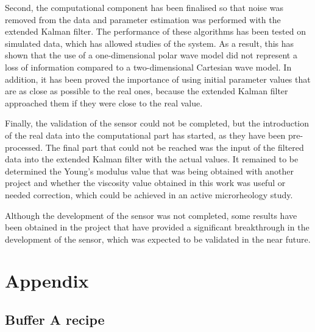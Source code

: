 \documentclass[12pt, a4paper]{article} %
\begin{document}
	Second, the computational component has been finalised so that noise was removed from the data and parameter estimation was performed with the extended Kalman filter. The performance of these algorithms has been tested on simulated data, which has allowed studies of the system. As a result, this has shown that the use of a one-dimensional polar wave model did not represent a loss of information compared to a two-dimensional Cartesian wave model. 
	In addition, it has been proved the importance of using initial parameter values that are as close as possible to the real ones, because the extended Kalman filter approached them if they were close to the real value.
	
	Finally, the validation of the sensor could not be completed, but the introduction of the real data into the computational part has started, as they have been pre-processed. The final part that could not be reached was the input of the filtered data into the extended Kalman filter with the actual values. It remained to be determined the Young's modulus value that was being obtained with another project and whether the viscosity value obtained in this work was useful or needed correction, which could be achieved in an active microrheology study. 
	
	Although the development of the sensor was not completed, some results have been obtained in the project that have provided a significant breakthrough in the development of the sensor, which was expected to be validated in the near future.
	
	\newpage
	\setlength{\parskip}{0mm}
	
	\pagestyle{empty}
	
	
	
	\newpage
	\setlength{\parskip}{0mm}
	\appendix
	\section{Appendix}
	
	\subsection{Buffer A recipe}
	
\end{document}
